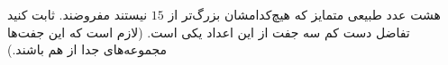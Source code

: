 \EXERCISE
هشت عدد طبیعی متمایز که هیچ‌کدامشان بزرگ‌تر از
$15$
نیستند مفروضند. ثابت کنید تفاضل دست کم سه جفت از این اعداد یکی است. (لازم است که این جفت‌ها مجموعه‌های جدا از هم باشند.)